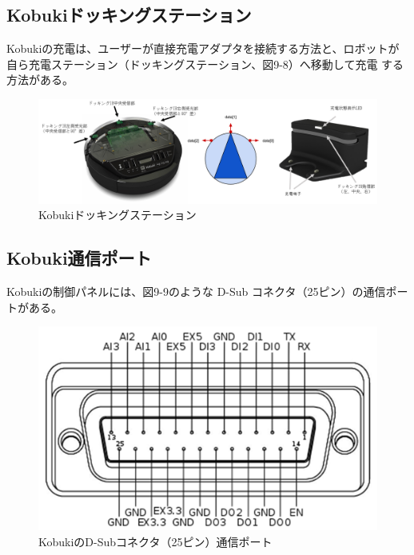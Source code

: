 \subsection{Kobukiドッキングステーション}

Kobukiの充電は、ユーザーが直接充電アダプタを接続する方法と、ロボットが自ら充電ステーション（ドッキングステーション、図9-8）へ移動して充電  する方法がある。

\begin{figure}[ht]
  \centering
  \includegraphics[width=\columnwidth]{pictures/chapter9/pic_09_08.png}
  \caption{Kobukiドッキングステーション}
\end{figure}

\subsection{Kobuki通信ポート}

Kobukiの制御パネルには、図9-9のような D-Sub コネクタ（25ピン）の通信ポートがある。

\begin{figure}[ht]
  \centering
  \includegraphics[width=\columnwidth]{pictures/chapter9/pic_09_09.png}
  \caption{KobukiのD-Subコネクタ（25ピン）通信ポート}
\end{figure}

